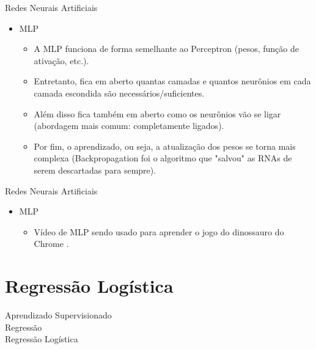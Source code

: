 \documentclass{libs/ufc_format}
\begin{document}
\begin{frame}{Redes Neurais Artificiais}
    \begin{itemize}
        \item MLP
            \begin{itemize}
                \justifying
                \item A MLP funciona de forma semelhante ao Perceptron (pesos, função de ativação, etc.).
                \item Entretanto, fica em aberto quantas camadas e quantos neurônios em cada camada escondida são necessários/suficientes.
                \item Além disso fica também em aberto como os neurônios vão se ligar (abordagem mais comum: completamente ligados).
                \item Por fim, o aprendizado, ou seja, a atualização dos pesos se torna mais complexa (Backpropagation foi o algoritmo que "salvou" as RNAs de serem descartadas para sempre).
            \end{itemize}
    \end{itemize}
\end{frame}

\begin{frame}{Redes Neurais Artificiais}
    \begin{itemize}
        \item MLP
            \begin{itemize}
                \justifying
                \item Vídeo de MLP sendo usado para aprender o jogo do dinossauro do Chrome \cite{up19}.
            \end{itemize}
    \end{itemize}
\end{frame}

\section{Regressão Logística}

\begin{frame}{}
    \centering
    \LARGE
    Aprendizado Supervisionado\\
    \vspace{0.5cm}
    \LARGE
    Regressão\\
    \vspace{0.5cm}
    \Large
    Regressão Logística
\end{frame}
\end{document}
